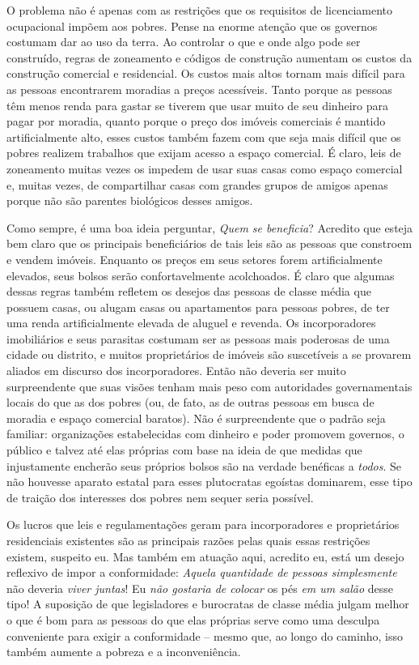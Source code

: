 O problema não é apenas com as restrições que os requisitos de licenciamento ocupacional impõem aos pobres. Pense na enorme atenção que os governos costumam dar ao uso da terra. Ao controlar o que e onde algo pode ser construído, regras de zoneamento e códigos de construção aumentam os custos da construção comercial e residencial. Os custos mais altos tornam mais difícil para as pessoas encontrarem moradias a preços acessíveis. Tanto porque as pessoas têm menos renda para gastar se tiverem que usar muito de seu dinheiro para pagar por moradia, quanto porque o preço dos imóveis comerciais é mantido artificialmente alto, esses custos também fazem com que seja mais difícil que os pobres realizem trabalhos que exijam acesso a espaço comercial. É claro, leis de zoneamento muitas vezes os impedem de usar suas casas como espaço comercial e, muitas vezes, de compartilhar casas com grandes grupos de amigos apenas porque não são parentes biológicos desses amigos.

Como sempre, é uma boa ideia perguntar, \emph{Quem se beneficia}? Acredito que esteja bem claro que os principais beneficiários de tais leis são as pessoas que constroem e vendem imóveis. Enquanto os preços em seus setores forem artificialmente elevados, seus bolsos serão confortavelmente acolchoados. É claro que algumas dessas regras também refletem os desejos das pessoas de classe média que possuem casas, ou alugam casas ou apartamentos para pessoas pobres, de ter uma renda artificialmente elevada de aluguel e revenda. Os incorporadores imobiliários e seus parasitas costumam ser as pessoas mais poderosas de uma cidade ou distrito, e muitos proprietários de imóveis são suscetíveis a se provarem aliados em discurso dos incorporadores. Então não deveria ser muito surpreendente que suas visões tenham mais peso com autoridades governamentais locais do que as dos pobres (ou, de fato, as de outras pessoas em busca de moradia e espaço comercial baratos). Não é surpreendente que o padrão seja familiar: organizações estabelecidas com dinheiro e poder promovem governos, o público e talvez até elas próprias com base na ideia de que medidas que injustamente encherão seus próprios bolsos são na verdade benéficas a \emph{todos}. Se não houvesse aparato estatal para esses plutocratas egoístas dominarem, esse tipo de traição dos interesses dos pobres nem sequer seria possível.

Os lucros que leis e regulamentações geram para incorporadores e proprietários residenciais existentes são as principais razões pelas quais essas restrições existem, suspeito eu. Mas também em atuação aqui, acredito eu, está um desejo reflexivo de impor a conformidade: \emph{Aquela quantidade de pessoas simplesmente} não deveria \emph{viver juntas}! Eu \emph{não gostaria de colocar} os pés \emph{em um salão} desse tipo! A suposição de que legisladores e burocratas de classe média julgam melhor o que é bom para as pessoas do que elas próprias serve como uma desculpa conveniente para exigir a conformidade -- mesmo que, ao longo do caminho, isso também aumente a pobreza e a inconveniência.

